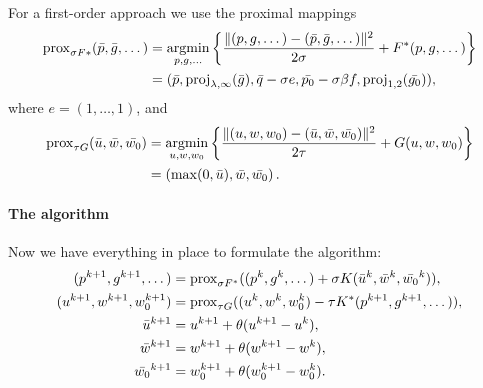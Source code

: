 For a first-order approach we use the proximal mappings
\begin{align*}
    \Prox_{\sigma F*}(\bar{p},\bar{g},\dots)
    &= \argmin_{p,g,\dots} \left\{
        \frac{
            \|(p,g,\dots)-(\bar{p},\bar{g},\dots)\|^2
        }{2\sigma} + F^*(p,g,\dots)
    \right\} \\
    &= (
        \bar{p},
        \proj_{\lambda,\infty}(\bar{g}),
        \bar{q}-\sigma e,
        \bar{p_0} - \sigma \beta f,
        \proj_{1,2}(\bar{g_0})
    ),
\end{align*}
where $e = (1,\dots,1)$, and
\begin{align*}
    \Prox_{\tau G}(\bar{u},\bar{w},\bar{w_0})
    &= \argmin_{u,w,w_0} \left\{
        \frac{
            \|(u,w,w_0)-(\bar{u},\bar{w},\bar{w_0})\|^2
        }{2\tau} + G(u,w,w_0)
    \right\} \\
    &= \left(
        \max(0,\bar{u}),
        \bar{w},
        \bar{w_0}
    \right).
\end{align*}

\paragraph{The algorithm}

Now we have everything in place to formulate the algorithm:
\begin{align*}
    (p^{k+1},g^{k+1},\dots) &= \operatorname{prox}_{\sigma F^*}(
        (p^{k},g^{k},\dots)
        + \sigma K(\bar{u}^{k},\bar{w}^{k},\bar{w_0}^{k})
    ), \\
    (u^{k+1},w^{k+1},w_0^{k+1}) &= \operatorname{prox}_{\tau G}(
        (u^{k},w^{k},w_0^{k})-\tau K^*(p^{k+1},g^{k+1},\dots)
    ), \\
    \bar{u}^{k+1} &= u^{k+1} + \theta(u^{k+1}-u^{k}), \\
    \bar{w}^{k+1} &= w^{k+1} + \theta(w^{k+1}-w^{k}), \\
    \bar{w_0}^{k+1} &= w_0^{k+1} + \theta(w_0^{k+1}-w_0^{k}).
\end{align*}

